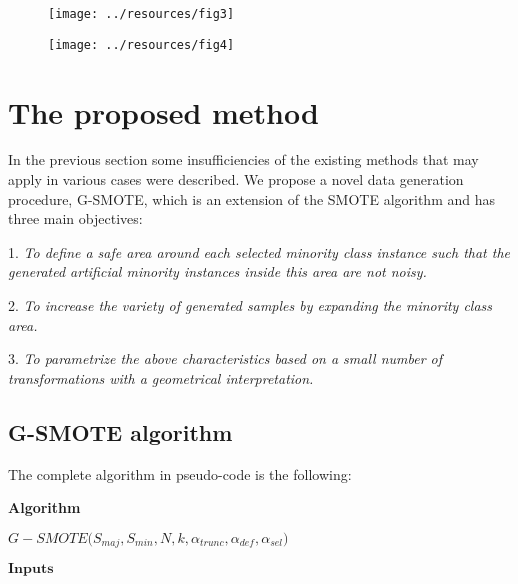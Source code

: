 \documentclass[parskip=full]{scrartcl}
\begin{document}
\begin{figure}[H]
	\centering
	\texttt{[image: ../resources/fig3]}
\end{figure}


\begin{figure}[H]
	\centering
	\texttt{[image: ../resources/fig4]}
\end{figure}

\section{The proposed method}

In the previous section some insufficiencies of the existing methods that may apply in various cases were described. We propose a novel data generation procedure, G-SMOTE, which is an extension of the SMOTE algorithm and has three main objectives:

1. \textit{To define a safe area around each selected minority class instance such that the generated artificial minority instances inside this area are not noisy.}

2. \textit{To increase the variety of generated samples by expanding the minority class area.}

3. \textit{To parametrize the above characteristics based on a small number of transformations with a geometrical interpretation.}

\subsection{G-SMOTE algorithm}

The complete algorithm in pseudo-code is the following:

\textbf{Algorithm}

\( G-SMOTE \Big( S_{maj}, S_{min}, N, k, \alpha_{trunc}, \alpha_{def}, \alpha_{sel} \Big) \)

\( \textbf{Inputs} \)
\end{document}
